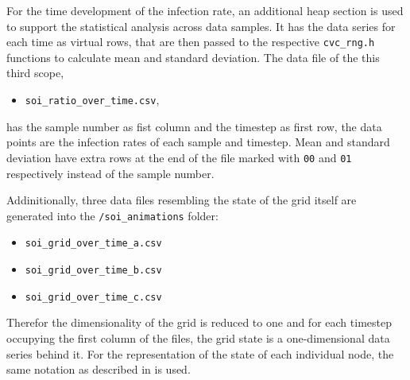 For the time development of the infection rate, an additional heap section is used to support the statistical analysis across data samples. It has the data series for each time as virtual rows,
that are then passed to the respective \texttt{cvc\_rng.h} functions to calculate mean and standard deviation. The data file of the this third scope,
\begin{itemize}
    \item \texttt{soi\_ratio\_over\_time.csv},
\end{itemize}
has the sample number as fist column and the timestep as first row, the data points are the infection rates of each sample and timestep. 
Mean and standard deviation have extra rows at the end of the file marked with \texttt{00} and \texttt{01} respectively instead of the sample number.

Addinitionally, three data files resembling the state of the grid itself are generated into the \texttt{/soi\_animations} folder:
\begin{itemize}
    \item \texttt{soi\_grid\_over\_time\_a.csv}
    \item \texttt{soi\_grid\_over\_time\_b.csv}
    \item \texttt{soi\_grid\_over\_time\_c.csv}
\end{itemize}

Therefor the dimensionality of the grid is reduced to one and for each timestep occupying the first column of the files, the grid state is a one-dimensional data series behind it.
For the representation of the state of each individual node, the same notation as described in  is used.



